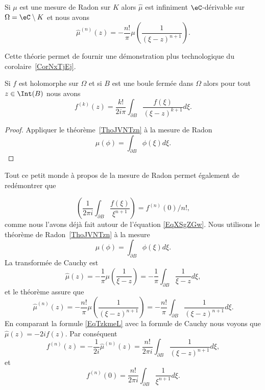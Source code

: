 \begin{theorem}     \label{ThoJVNTzn}
	Si \( \mu\) est une mesure de Radon sur \( K\) alors \( \hat \mu\) est infiniment \( \eC\)-dérivable sur \( \Omega=\eC\setminus K\) et nous avons
	\begin{equation}
		\hat\mu^{(n)}(z)=-\frac{ n! }{ \pi }\mu\left( \frac{1}{ (\xi-z)^{n+1} } \right).
	\end{equation}
\end{theorem}

Cette théorie permet de fournir une démonstration plus technologique du corolaire~\ref{CorNxTjEj}.
\begin{lemma}
	Si \( f\) est holomorphe sur \( \Omega\) et si \( B\) est une boule fermée dans \( \Omega\) alors pour tout \( z\in \Int(B)\) nous avons
	\begin{equation}
		f^{(k)}(z)=\frac{ k! }{ 2i\pi }\int_{\partial B}\frac{ f(\xi) }{ (\xi-z)^{k+1} }d\xi.
	\end{equation}
\end{lemma}

\begin{proof}
	Appliquer le théorème~\ref{ThoJVNTzn} à la mesure de Radon
	\begin{equation}
		\mu(\phi)=\int_{\partial B}\phi(\xi)d\xi.
	\end{equation}
\end{proof}

Tout ce petit monde à propos de la mesure de Radon permet également de redémontrer que

\begin{equation}
	\left( \frac{1}{ 2\pi i }\int_{\partial B}\frac{ f(\xi) }{ \xi^{n+1} } \right)=f^{(n)}(0)/n!,
\end{equation}
comme nous l'avons déjà fait autour de l'équation \eqref{EqXSgZGw}. Nous utilisons le théorème de Radon~\ref{ThoJVNTzn} à la mesure
\begin{equation}
	\mu(\phi)=\int_{\partial B}\phi(\xi)d\xi.
\end{equation}
La transformée de Cauchy est
\begin{equation}        \label{EqTzkmeL}
	\hat \mu(z)=-\frac{1}{ \pi }\mu\left( \frac{1}{ \xi-z } \right)=-\frac{1}{ \pi }\int_{\partial B}\frac{1}{ \xi-z }d\xi,
\end{equation}
et le théorème assure que
\begin{equation}
	\hat\mu^{(n)}(z)=-\frac{ n! }{ \pi }\mu\left( \frac{1}{ (\xi-z)^{n+1} } \right)=-\frac{ n! }{ \pi }\int_{\partial B}\frac{ 1 }{ (\xi-z)^{n+1} }d\xi.
\end{equation}
En comparant la formule \eqref{EqTzkmeL} avec la formule de Cauchy nous voyons que \( \hat\mu(z)=-2i f(z)\). Par conséquent
\begin{equation}
	f^{(n)}(z)=-\frac{1}{ 2i }\hat\mu^{(n)}(z)=\frac{ n! }{ 2\pi i }\int_{\partial B}\frac{1}{ (\xi-z)^{n+1} }d\xi,
\end{equation}
et
\begin{equation}
	f^{(n)}(0)=\frac{ n! }{ 2\pi i }\int_{\partial B}\frac{1}{ \xi^{n+1} }d\xi.
\end{equation}

